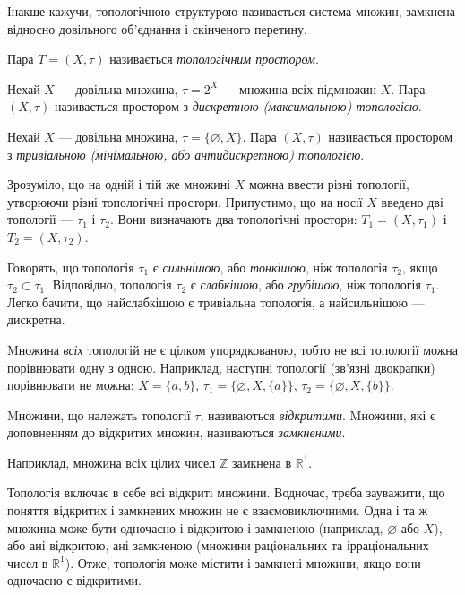 \documentclass[a4paper, 12pt]{article}
\newcommand{\RR}{\mathbb{R}}
\newcommand{\ZZ}{\mathbb{Z}}
\renewcommand{\emptyset}{\varnothing}
\begin{document}
Інакше кажучи, топологічною структурою називається
система множин, замкнена відносно довільного об'єднання
і скінченого перетину.

\begin{definition}
	Пара $T = (X, \tau)$ називається \textit{топологічним
	простором}.
\end{definition}

\begin{example}
	Нехай $X$ --- довільна множина, $\tau = 2^X$ ---
	множина всіх підмножин $X$. Пара $(X, \tau)$ називається
	простором з \textit{дискретною (максимальною) топологією}.
\end{example}

\begin{example}
	Нехай $X$ --- довільна множина, $\tau = \{\emptyset, X\}$.
	Пара $(X, \tau)$ називається простором з \textit{тривіальною
	(мінімальною, або антидискретною) топологією}.
\end{example}

Зрозуміло, що на одній і тій же множині $X$ можна ввести
різні топології, утворюючи різні топологічні простори.
Припустимо, що на носії $X$ введено дві топології --- $\tau_1$ і $\tau_2$.
Вони визначають два топологічні простори: $T_1 = (X, \tau_1)$ і
$T_2 = (X, \tau_2)$. \medskip

Говорять, що топологія $\tau_1$ є \textit{сильнішою}, або \textit{тонкішою},
ніж топологія $\tau_2$, якщо $\tau_2 \subset \tau_1$. Відповідно, топологія $\tau_2$ є
\textit{слабкішою}, або \textit{грубішою}, ніж топологія $\tau_1$. Легко бачити,
що найслабкішою є тривіальна топологія, а
найсильнішою --- дискретна.

\begin{remark}
	Mножина \textit{всіх} топологій не є цілком
	упорядкованою, тобто не всі топології можна порівнювати
	одну з одною. Наприклад, наступні топології (зв'язні
	двокрапки) порівнювати не можна: $X = \{a, b\}$,
	$\tau_1 = \{\emptyset, X, \{a\}\}$, $\tau_2 = \{\emptyset, X, \{b\}\}$.
\end{remark}

\begin{definition}
	Mножини, що належать топології $\tau$,
	називаються \textit{відкритими}. Mножини, які є доповненням до
	відкритих множин, називаються \textit{замкненими}.
\end{definition}

Наприклад, множина всіх цілих чисел $\ZZ$ замкнена в $\RR^1$.

\begin{remark}
	Топологія включає в себе всі відкриті
	множини. Водночас, треба зауважити, що поняття
	відкритих і замкнених множин не є взаємовиключними.
	Одна і та ж множина може бути одночасно і відкритою і
	замкненою (наприклад, $\emptyset$ або $X$), або ані відкритою, ані
	замкненою (множини раціональних та ірраціональних чисел
	в $\RR^1$). Отже, топологія може містити і замкнені множини,
	якщо вони одночасно є відкритими.
\end{remark}
\end{document}
